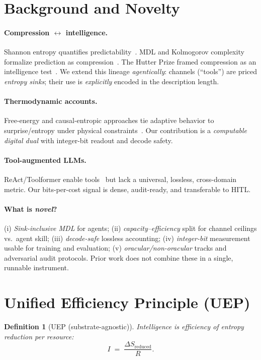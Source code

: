 \documentclass[12pt,a4paper]{article}
\newtheorem{definition}{Definition}
\begin{document}
\section{Background and Novelty}
\paragraph{Compression $\leftrightarrow$ intelligence.}
Shannon entropy quantifies predictability~\citep{shannon1948}. MDL and Kolmogorov complexity formalize prediction as compression~\citep{rissanen1978modeling,kolmogorov1965three}. The Hutter Prize framed compression as an intelligence test~\citep{mahoney2005ltcb,hutterprize}. We extend this lineage \emph{agentically}: channels (``tools'') are priced \emph{entropy sinks}; their use is \emph{explicitly} encoded in the description length.

\paragraph{Thermodynamic accounts.}
Free-energy and causal-entropic approaches tie adaptive behavior to surprise/entropy under physical constraints~\citep{friston2010free,wissnergross2013causal}. Our contribution is a \emph{computable digital dual} with integer-bit readout and decode safety.

\paragraph{Tool-augmented LLMs.}
ReAct/Toolformer enable tools~\citep{yao2022react,schick2023toolformer} but lack a universal, lossless, cross-domain metric. Our bits-per-cost signal is dense, audit-ready, and transferable to HITL.

\paragraph{What is \emph{novel}?}
(i) \emph{Sink-inclusive MDL} for agents; (ii) \emph{capacity--efficiency} split for channel ceilings vs.\ agent skill; (iii) \emph{decode-safe} lossless accounting; (iv) \emph{integer-bit} measurement usable for training and evaluation; (v) \emph{oracular/non-oracular} tracks and adversarial audit protocols. Prior work does not combine these in a single, runnable instrument.

\section{Unified Efficiency Principle (UEP)}
\label{sec:uep}
\begin{definition}[UEP (substrate-agnostic)]
Intelligence is efficiency of entropy reduction per resource:
\begin{equation}
I\;=\;\frac{\Delta S_{\text{reduced}}}{R}.
\end{equation}
\end{definition}
\end{document}
